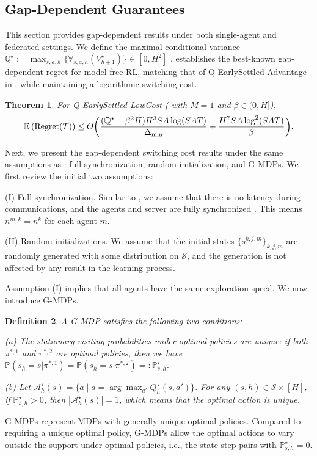 \documentclass{article}
\newtheorem{theorem}{Theorem}[section]
\newtheorem{definition}[theorem]{Definition}
\def\dmin{\Delta_{\textnormal{min}}}
\begin{document}
\subsection{Gap-Dependent Guarantees}
\label{gapde}
This section provides gap-dependent results under both single-agent and federated settings. We define the maximal conditional variance $\mathbb{Q}^{\star} := \max_{s,a,h}\big\{\mathbb{V}_{s,a,h}(V_{h+1}^{\star})\big\} \in [0,H^2]$ \cite{zanette2019tighter}.
 establishes the best-known gap-dependent regret for model-free RL, matching that of Q-EarlySettled-Advantage in \citep{zheng2024gap}, while maintaining a logarithmic switching cost.
\begin{theorem}
\label{thm_gapregret} 
For Q-EarlySettled-LowCost ( with $M=1$ and $\beta \in (0,H]$),
\begin{equation*}
\mathbb{E}\left(\textnormal{Regret}(T)\right) \leq O\bigg(\frac{(\mathbb{Q}^\star+\beta^2H)H^3SA\log (SAT)}{\dmin}+   \frac{H^7SA\log^2 (SAT)}{\beta}\bigg).
\end{equation*}
\end{theorem}
Next, we present the gap-dependent switching cost results under the same assumptions as \cite{zhang2025gapdependent}: full synchronization, random initialization, and G-MDPs. We first review the initial two assumptions:

(I) Full synchronization. Similar to \cite{zheng2023federated}, we assume that there is no latency during communications, and the agents and server are fully synchronized \citep{mcmahan2017communication}. This means $n^{m,k} = n^k$ for each agent $m$. 

(II) Random initializations. We assume that the initial states $\{s_1^{k,j,m}\}_{k,j,m}$ are randomly generated with some distribution on $\mathcal{S}$, and the generation is not affected by any result in the learning process.

Assumption (I) implies that all agents have the same exploration speed. We now introduce G-MDPs.
\begin{definition}
\label{assumptioncost}
    A G-MDP satisfies the following two conditions:
    
(a) The stationary visiting probabilities under optimal policies are unique: if both $\pi^{*,1}$ and $\pi^{*,2}$ are optimal policies, then we have $\mathbb{P}\left(s_h = s | \pi^{*,1}\right) = \mathbb{P}\left(s_h = s | \pi^{*,2}\right)=: \mathbb{P}_{s,h}^{\star}.$

(b) Let $\mathcal{A}_h^{\star}(s) = \{a \mid a = \arg \max_{a'} Q_h^{\star}(s,a')\}$. For any $(s,h)\in \mathcal{S}\times[H]$, if $\mathbb{P}_{s,h}^{\star} > 0$, then $|\mathcal{A}_h^{\star}(s)| = 1$, which means that the optimal action is unique.
\end{definition}
G-MDPs represent MDPs with generally unique optimal policies. Compared to requiring a unique optimal policy, G-MDPs allow the optimal actions to vary outside the support under optimal policies, i.e., the state-step pairs with $\mathbb{P}_{s,h}^{\star} = 0$. 
\end{document}
